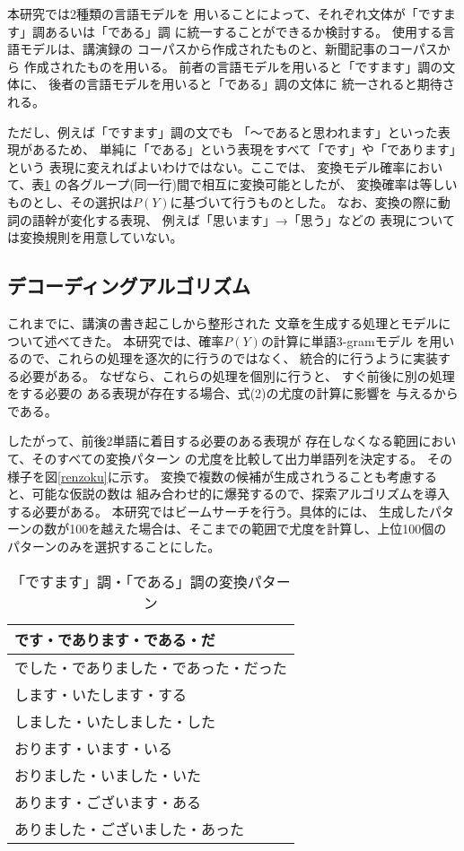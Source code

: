 本研究では2種類の言語モデルを
用いることによって、それぞれ文体が「ですます」調あるいは「である」調
に統一することができるか検討する。
使用する言語モデルは、講演録の
コーパスから作成されたものと、新聞記事のコーパスから
作成されたものを用いる。
前者の言語モデルを用いると「ですます」調の文体に、
後者の言語モデルを用いると「である」調の文体に
統一されると期待される。

ただし、例えば「ですます」調の文でも
「〜であると思われます」といった表現があるため、
単純に「である」という表現をすべて「です」や「であります」という
表現に変えればよいわけではない。ここでは、
変換モデル確率において、表\ref{desumasu}
の各グループ(同一行)間で相互に変換可能としたが、
変換確率は等しいものとし、その選択は$P(Y)$に基づいて行うものとした。
なお、変換の際に動詞の語幹が変化する表現、
例えば「思います」→「思う」などの
表現については変換規則を用意していない。

\subsection{デコーディングアルゴリズム}

これまでに、講演の書き起こしから整形された
文章を生成する処理とモデルについて述べてきた。
本研究では、確率$P(Y)$の計算に単語3-gramモデル
を用いるので、これらの処理を逐次的に行うのではなく、
統合的に行うように実装する必要がある。
なぜなら、これらの処理を個別に行うと、
すぐ前後に別の処理をする必要の
ある表現が存在する場合、式(2)の尤度の計算に影響を
与えるからである。

したがって、前後2単語に着目する必要のある表現が
存在しなくなる範囲において、そのすべての変換パターン
の尤度を比較して出力単語列を決定する。
その様子を図\ref{renzoku}に示す。
変換で複数の候補が生成されうることも考慮すると、可能な仮説の数は
組み合わせ的に爆発するので、探索アルゴリズムを導入する必要がある。
本研究ではビームサーチを行う。具体的には、
生成したパターンの数が100を越えた場合は、そこまでの範囲で尤度を計算し、上位100個の
パターンのみを選択することにした。

\begin{table}[t]
\begin{center}
\caption{「ですます」調・「である」調の変換パターン}\label{desumasu}
\vspace{2.0mm}
\begin{tabular}{|l|}			\hline
です・であります・である・だ		\\\hline
でした・でありました・であった・だった  \\\hline
します・いたします・する		\\\hline
しました・いたしました・した		\\\hline
おります・います・いる			\\\hline
おりました・いました・いた		\\\hline
あります・ございます・ある		\\\hline
ありました・ございました・あった	\\\hline
\end{tabular}
\end{center}
\end{table}

